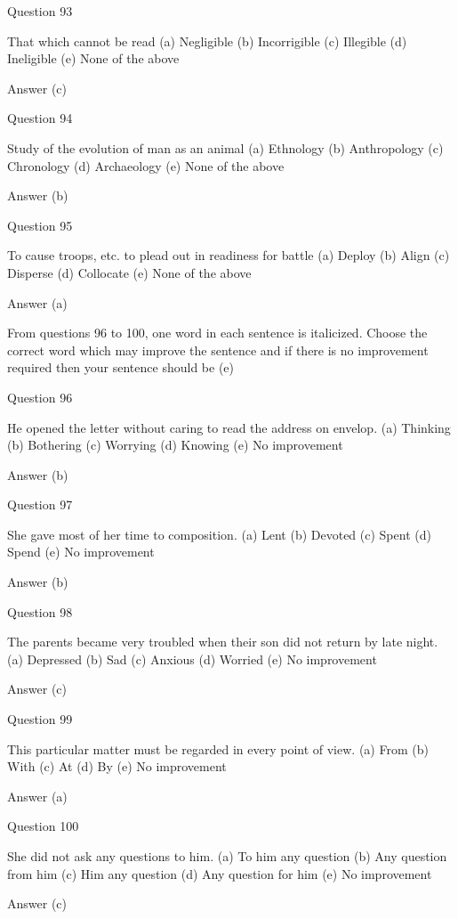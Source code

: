 Question 93

That which cannot be read
(a) Negligible
(b) Incorrigible
(c) Illegible
(d) Ineligible
(e) None of the above

Answer (c)

Question 94

Study of the evolution of man as an animal
(a) Ethnology
(b) Anthropology
(c) Chronology
(d) Archaeology
(e) None of the above

Answer (b)

Question 95

To cause troops, etc. to plead out in readiness for battle
(a) Deploy
(b) Align
(c) Disperse
(d) Collocate
(e) None of the above

Answer (a)


From questions 96 to 100, one word in each sentence is italicized. Choose the correct word which may improve the sentence and if there is no improvement required then your sentence should be (e)

Question 96

He opened the letter without caring to read the address on envelop.
(a) Thinking
(b) Bothering
(c) Worrying
(d) Knowing
(e) No improvement

Answer (b)

Question 97

She gave most of her time to composition.
(a) Lent
(b) Devoted
(c) Spent
(d) Spend
(e) No improvement

Answer (b)

Question 98

The parents became very troubled when their son did not return by late night.
(a) Depressed
(b) Sad
(c) Anxious
(d) Worried
(e) No improvement

Answer (c)

Question 99

This particular matter must be regarded in every point of view.
(a) From
(b) With
(c) At
(d) By
(e) No improvement

Answer (a)

Question 100

She did not ask any questions to him.
(a) To him any question
(b) Any question from him
(c) Him any question
(d) Any question for him
(e) No improvement

Answer (c)



